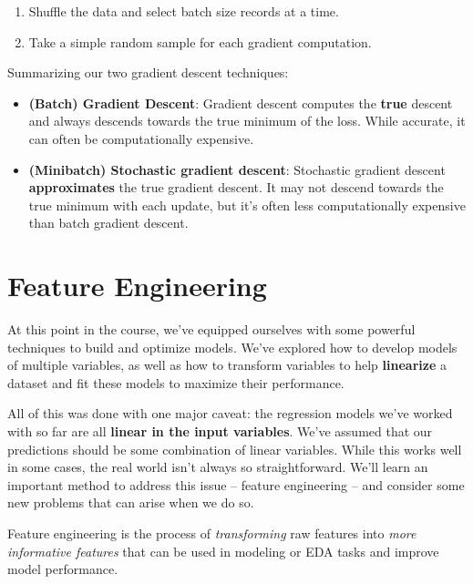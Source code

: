 \documentclass[
  letterpaper,
  DIV=11,
  numbers=noendperiod]{scrreprt}
\providecommand{\tightlist}{%
  \setlength{\itemsep}{0pt}\setlength{\parskip}{0pt}}\usepackage{longtable,booktabs,array}
\begin{document}
\begin{enumerate}
\def\labelenumi{\arabic{enumi}.}
\tightlist
\item
  Shuffle the data and select batch size records at a time.
\item
  Take a simple random sample for each gradient computation.
\end{enumerate}

Summarizing our two gradient descent techniques:

\begin{itemize}
\tightlist
\item
  \textbf{(Batch) Gradient Descent}: Gradient descent computes the
  \textbf{true} descent and always descends towards the true minimum of
  the loss. While accurate, it can often be computationally expensive.
\end{itemize}

\begin{itemize}
\tightlist
\item
  \textbf{(Minibatch) Stochastic gradient descent}: Stochastic gradient
  descent \textbf{approximates} the true gradient descent. It may not
  descend towards the true minimum with each update, but it's often less
  computationally expensive than batch gradient descent.
\end{itemize}

\section{Feature Engineering}\label{feature-engineering-1}

At this point in the course, we've equipped ourselves with some powerful
techniques to build and optimize models. We've explored how to develop
models of multiple variables, as well as how to transform variables to
help \textbf{linearize} a dataset and fit these models to maximize their
performance.

All of this was done with one major caveat: the regression models we've
worked with so far are all \textbf{linear in the input variables}. We've
assumed that our predictions should be some combination of linear
variables. While this works well in some cases, the real world isn't
always so straightforward. We'll learn an important method to address
this issue -- feature engineering -- and consider some new problems that
can arise when we do so.

Feature engineering is the process of \emph{transforming} raw features
into \emph{more informative features} that can be used in modeling or
EDA tasks and improve model performance.
\end{document}
